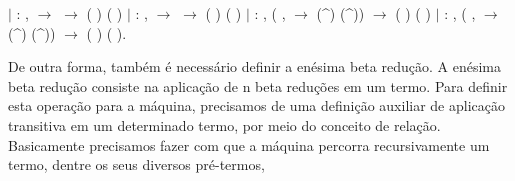 \begin{coqdoccode}
\coqdocindent{1.00em}
\ensuremath{|}  : \coqdockw{\ensuremath{\forall}}   ,     \ensuremath{\rightarrow}   \ensuremath{\rightarrow}\coqdoceol
\coqdocindent{15.00em}
  (  ) (  )\coqdoceol
\coqdocindent{1.00em}
\ensuremath{|}  : \coqdockw{\ensuremath{\forall}}   ,     \ensuremath{\rightarrow}   \ensuremath{\rightarrow}\coqdoceol
\coqdocindent{15.50em}
  (  ) (  )\coqdoceol
\coqdocindent{1.00em}
\ensuremath{|}  : \coqdockw{\ensuremath{\forall}}   , (\coqdockw{\ensuremath{\forall}} ,    \ensuremath{\rightarrow}   (\^{}) (\^{})) \ensuremath{\rightarrow}\coqdoceol
\coqdocindent{15.50em}
  ( ) ( )\coqdoceol
\coqdocindent{1.00em}
\ensuremath{|}  : \coqdockw{\ensuremath{\forall}}   , (\coqdockw{\ensuremath{\forall}} ,    \ensuremath{\rightarrow}   (\^{}) (\^{})) \ensuremath{\rightarrow}\coqdoceol
\coqdocindent{15.50em}
  ( ) ( ).\coqdoceol
\coqdocemptyline
\end{coqdoccode}
De outra forma, também é necessário definir a enésima beta redução. A enésima beta redução consiste na aplicação de n beta reduções
em um termo. Para definir esta operação para a máquina, precisamos de uma definição auxiliar de aplicação transitiva em um determinado termo,
por meio do conceito de relação. Basicamente precisamos fazer com que a máquina percorra recursivamente um termo, dentre os seus diversos pré-termos,
